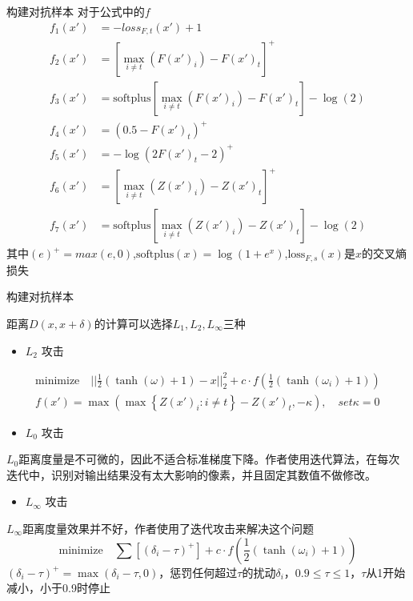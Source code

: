 \begin{frame}{构建对抗样本}
    对于公式中的$f$
    \begin{equation}
        \begin{aligned}
            f_1(x') & = -loss_{F,t}(x')+1 \\
            f_2(x') & = [\mathop{\max}\limits_{i\neq t}(F(x')_i)-F(x')_t]^+ \\
            f_3(x') & = \text{softplus}[\mathop{\max}\limits_{i\neq t}(F(x')_i)-F(x')_t]-\log(2) \\
            f_4(x') & = (0.5-F(x')_t)^+ \\
            f_5(x') & = -\log(2F(x')_t-2)^+ \\
            f_6(x') & = [\mathop{\max}\limits_{i\neq t}(Z(x')_i)-Z(x')_t]^+ \\
            f_7(x') & = \text{softplus}[\mathop{\max}\limits_{i\neq t}(Z(x')_i)-Z(x')_t]-\log(2)
        \end{aligned}
    \end{equation}
    其中$(e)^+=max(e,0)$,$\text{softplus}(x)=\log(1+e^x)$,$\text{loss}_{F,s}(x)$是$x$的交叉熵损失
\end{frame}


\begin{frame}{构建对抗样本}
    \begin{scriptsize}
        距离$D(x,x+\delta)$的计算可以选择$L_1,L_2,L_\infty$三种
        \begin{itemize}
            \item $L_2$ 攻击
        \end{itemize}
        \begin{equation}
            \begin{aligned}
                \text{minimize}\quad ||\frac{1}{2}(\tanh(\omega)+1)-x||_2^2+c\cdot f(\frac{1}{2}(\tanh(\omega_i)+1)) \\
                f(x')=\max(\max\left\{Z(x')_i:i\neq t\right\}-Z(x')_t,-\kappa),\quad set \kappa=0
            \end{aligned}
        \end{equation}


        \begin{itemize}
            \item $L_0$ 攻击
        \end{itemize}
        $L_0$距离度量是不可微的，因此不适合标准梯度下降。作者使用迭代算法，在每次迭代中，识别对输出结果没有太大影响的像素，并且固定其数值不做修改。

        \begin{itemize}
            \item $L_\infty$ 攻击
        \end{itemize}
        $L_\infty$距离度量效果并不好，作者使用了迭代攻击来解决这个问题
        \begin{equation}
            \text{minimize}\quad \sum[(\delta_i-\tau)^+]+c\cdot f(\frac{1}{2}(\tanh(\omega_i)+1))
        \end{equation}
        $(\delta_i-\tau)^+=\max(\delta_i-\tau,0)$，惩罚任何超过$\tau$的扰动$\delta_i$，$0.9\leq \tau\leq 1$，\(\tau\)从1开始减小，小于0.9时停止
    \end{scriptsize}
\end{frame}

